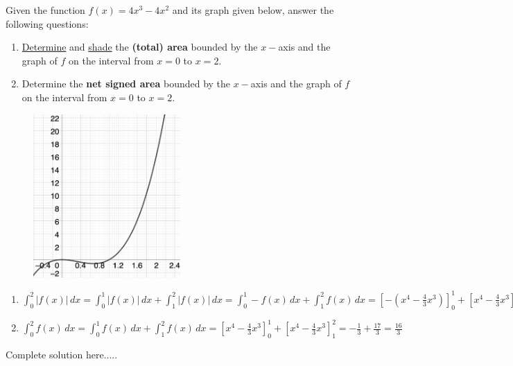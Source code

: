 \begin{example}
Given the function $f(x)=4x^3-4x^2$ and its graph given below, answer the following questions: 
\renewcommand{\labelenumi}{\textbf{(\alph{enumi})}}
\begin{enumerate}[leftmargin=*]
    \item \underline{Determine} and \underline{shade} the \textbf{(total) area} bounded by the $x-$axis and the graph of $f$ on the interval from $x=0$ to $x=2$. 
    \item Determine the \textbf{net signed area} bounded by the $x-$axis and the graph of $f$ on the interval from $x=0$ to $x=2$.
\end{enumerate}
 
\begin{figure}[h!]
        \includegraphics[width=0.5\textwidth,inner]{images/defIntgArea/areaEx4.png}
        \captionsetup{justification=justified, singlelinecheck=false}
        \label{fig:areaEx2}
\end{figure}

    \begin{sol}
    \renewcommand{\labelenumi}{\textbf{(\alph{enumi})}}
    \begin{enumerate}[leftmargin=*]
    \item $\displaystyle\int_0^2 \bm{|}f(x)\bm{|}\,dx=\int_0^1 \bm{|}f(x)\bm{|}\,dx+\int_1^2 \bm{|}f(x)\bm{|}\,dx=\int_0^1 -f(x)\,dx+\int_1^2 f(x)\,dx=\left[-(x^4-\frac{4}{3}x^3)\right]_0^1+\left[x^4-\frac{4}{3}x^3\right]_1^2=\frac{1}{3}+\frac{17}{3}=6$
        \item $\displaystyle\int_0^2 f(x)\,dx=\int_0^1 f(x)\,dx+\int_1^2 f(x)\,dx=\left[x^4-\frac{4}{3}x^3\right]_0^1+\left[x^4-\frac{4}{3}x^3\right]_1^2=-\frac{1}{3}+\frac{17}{3}=\frac{16}{3}$
    \end{enumerate}
    \end{sol}
    \begin{solL}
    Complete solution here.....
    
    \end{solL}
\end{example}

